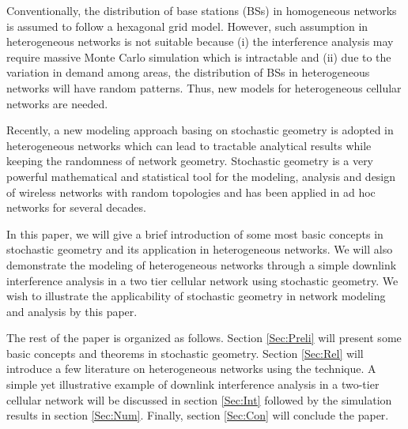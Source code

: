 \documentclass[a4paper,twocolumn]{IEEEtran}
\begin{document}
Conventionally, the distribution of base stations (BSs) in homogeneous networks is assumed to follow a hexagonal grid model. However, such assumption in heterogeneous networks is not suitable because (i) the interference analysis may require massive Monte Carlo simulation\cite{Gilhousen1991} which is intractable and (ii) due to the variation in demand among areas, the distribution of BSs in heterogeneous networks will have random patterns. Thus, new models for heterogeneous cellular networks are needed.

Recently, a new modeling approach basing on stochastic geometry is adopted in heterogeneous networks which can lead to tractable analytical results while keeping the randomness of network geometry. Stochastic geometry is a very powerful mathematical and statistical tool for the modeling, analysis and design of wireless networks with random topologies and has been applied in ad hoc networks for several decades\cite{Haenggi2013Book, Haenggi2009JSAC, Baccelli2009Vol1, Baccelli2009Vol2, Cardieri2010}.

In this paper, we will give a brief introduction of some most basic concepts in stochastic geometry and its application in heterogeneous networks. We will also demonstrate the modeling of heterogeneous networks through a simple downlink interference analysis in a two tier cellular network using stochastic geometry. We wish to illustrate the applicability of stochastic geometry in network modeling and analysis by this paper.

The rest of the paper is organized as follows. Section \ref{Sec:Preli} will present some basic concepts and theorems in stochastic geometry. Section \ref{Sec:Rel} will introduce a few literature on heterogeneous networks using the technique. A simple yet illustrative example of downlink interference analysis in a two-tier cellular network will be discussed in section \ref{Sec:Int} followed by the simulation results in section \ref{Sec:Num}. Finally, section \ref{Sec:Con} will conclude the paper.           
\end{document}
